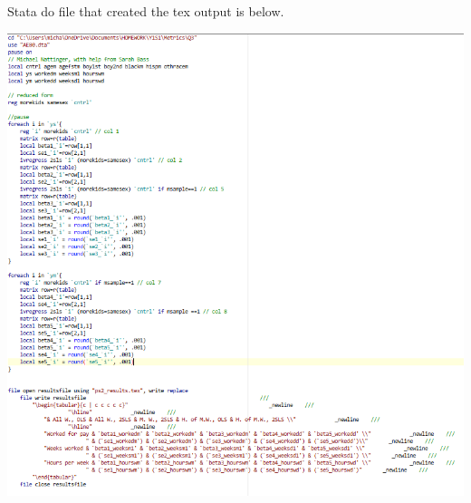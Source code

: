 \documentclass[11pt]{article} %
\begin{document}
Stata do file that created the tex output is below.

\includegraphics{hw2q5}
\end{document}
